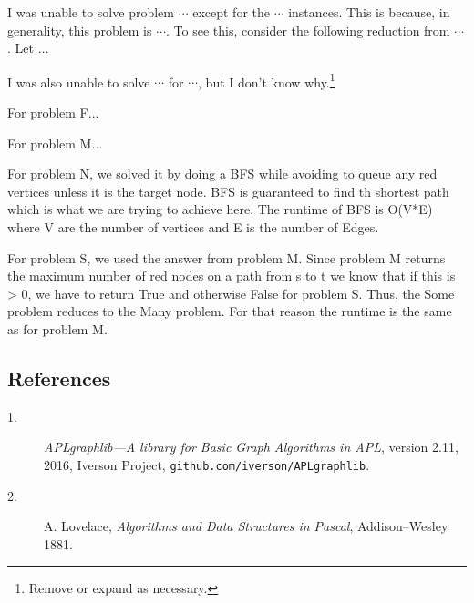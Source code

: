 \documentclass{tufte-handout}
\begin{document}
I was unable to solve problem $\cdots$ except for the $\cdots$ instances.
This is because, in generality, this problem is $\cdots$. 
To see this, consider the following reduction from $\cdots$.
Let $\ldots$ 

I was also unable to solve $\cdots$ for $\cdots$, but I don’t know why.\footnote{Remove or expand as necessary.}

For problem F...

For problem M...

For problem N, we solved it by doing a BFS while avoiding to queue any red vertices unless it is the target node. BFS is guaranteed
to find th shortest path which is what we are trying to achieve here.
The runtime of BFS is O(V*E) where V are the number of vertices and E is the number of Edges.

For problem S, we used the answer from problem M. Since problem M returns the maximum number of red nodes on a path from s to t we know that if this is > 0, we have
to return True and otherwise False for problem S. Thus, the Some problem reduces to the Many problem.
For that reason the runtime is the same as for problem M. 

\subsection{References}
\begin{description}
  \item[1.] \emph{APLgraphlib---A library for Basic Graph Algorithms in APL}, version 2.11, 2016, Iverson Project, {\tt github.com/iverson/APLgraphlib}.

  \item[2.] A. Lovelace, \emph{Algorithms and Data Structures in Pascal}, Addison--Wesley 1881. 
\end{description}
\end{document}
